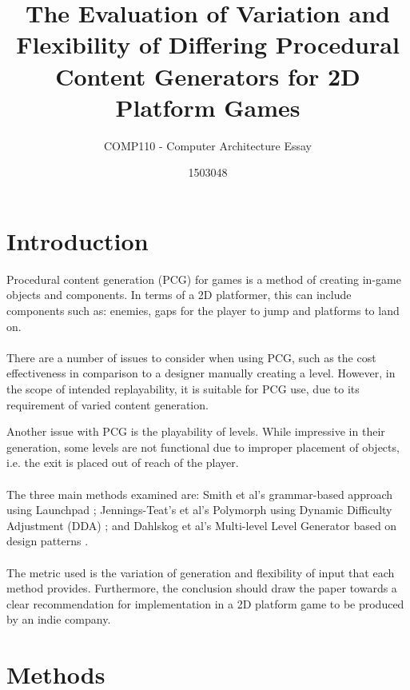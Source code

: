 \documentclass{scrartcl}
\title{The Evaluation of Variation and Flexibility of Differing Procedural Content Generators for 2D Platform Games}
\subtitle{COMP110 - Computer Architecture Essay}
\author{1503048}
\begin{document}
\maketitle


\section{Introduction}

Procedural content generation (PCG) for games is a method of creating in-game objects and components. In terms of a 2D platformer, this can include components such as: enemies, gaps for the player to jump and platforms to land on. \\ \\
There are a number of issues to consider when using PCG, such as the cost effectiveness in comparison to a designer manually creating a level. However, in the scope of intended replayability, it is suitable for PCG use, due to its requirement of varied content generation.

Another issue with PCG is the playability of levels. While impressive in their generation, some levels are not functional due to improper placement of objects, i.e. the exit is placed out of reach of the player. \\ \\
The three main methods examined are: Smith et al's grammar-based approach using Launchpad \cite{Smith2011} ; Jennings-Teat’s et al's Polymorph using Dynamic Difficulty Adjustment (DDA) \cite{Jennings2010:Model} ; and Dahlskog et al's Multi-level Level Generator based on design patterns \cite{Dahlskog2014}.\\ \\
The metric used is the variation of generation and flexibility of input that each method provides. Furthermore, the conclusion should draw the paper towards a clear recommendation for implementation in a 2D platform game to be produced by an indie company.

\section{Methods}
\end{document}
